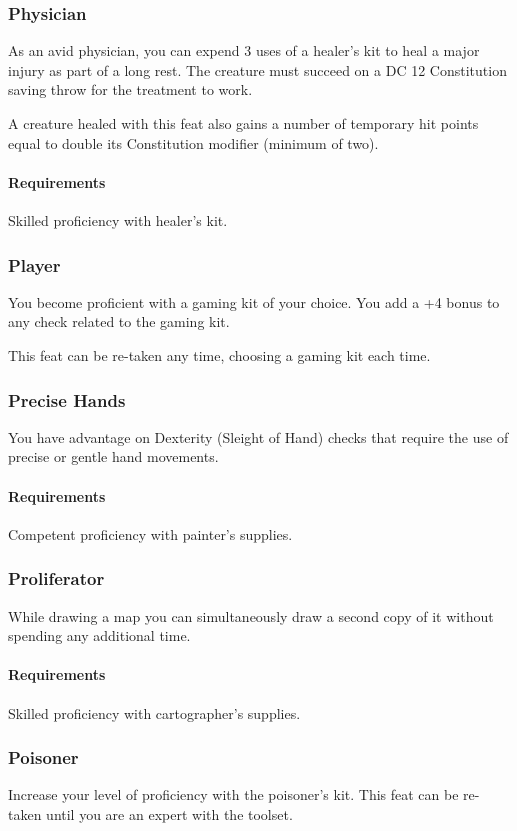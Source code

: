 \subsubsection{Physician} \label{feat::physician}
    As an avid physician, you can expend 3 uses of a healer's kit to heal a major injury as part of a long rest.
    The creature must succeed on a DC 12 Constitution saving throw for the treatment to work.

    A creature healed with this feat also gains a number of temporary hit points equal to double its Constitution modifier (minimum of two).
    \paragraph{Requirements} Skilled proficiency with healer's kit.
\subsubsection{Player} \label{feat::player}
    You become proficient with a gaming kit of your choice.
    You add a +4 bonus to any check related to the gaming kit.

    This feat can be re-taken any time, choosing a gaming kit each time.
\subsubsection{Precise Hands} \label{feat::precisehands}
    You have advantage on Dexterity (Sleight of Hand) checks that require the use of precise or gentle hand movements.
    \paragraph{Requirements} Competent proficiency with painter's supplies.
\subsubsection{Proliferator} \label{feat::proliferator}
    While drawing a map you can simultaneously draw a second copy of it without spending any additional time.
    \paragraph{Requirements} Skilled proficiency with cartographer's supplies.
\subsubsection{Poisoner} \label{feat::poisoner}
    Increase your level of proficiency with the poisoner's kit.
    This feat can be re-taken until you are an expert with the toolset.

